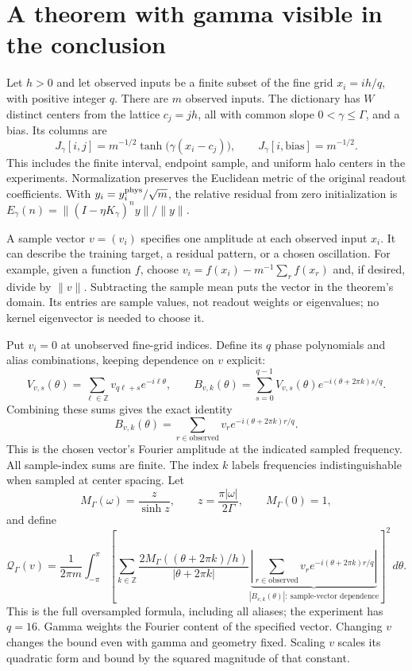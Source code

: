\documentclass[11pt]{article}
\theoremstyle{definition}
\begin{document}
\section{A theorem with gamma visible in the conclusion}
Let $h>0$ and let observed inputs be a finite subset of the fine grid
$x_i=ih/q$, with positive integer $q$. There are $m$ observed inputs.
The dictionary has $W$ distinct centers from the lattice $c_j=jh$, all
with common slope $0<\gamma\le\Gamma$, and a bias. Its columns are
\[
J_\gamma[i,j]=m^{-1/2}\tanh\bigl(\gamma(x_i-c_j)\bigr),\qquad
J_\gamma[i,\mathrm{bias}]=m^{-1/2}.
\]
This includes the finite interval, endpoint sample, and uniform halo centers
in the experiments. Normalization preserves the Euclidean metric of the
original readout coefficients. With $y_i=y_i^{\rm phys}/\sqrt m$, the
relative residual from zero initialization is
$E_\gamma(n)=\|(I-\eta K_\gamma)^ny\|/\|y\|$.

A sample vector $v=(v_i)$ specifies one amplitude at each observed input
$x_i$. It can describe the training target, a residual pattern, or a chosen
oscillation. For example, given a function $f$, choose
$v_i=f(x_i)-m^{-1}\sum_r f(x_r)$ and, if desired, divide by $\|v\|$.
Subtracting the sample mean puts the vector in the theorem's domain.
Its entries are sample values, not readout weights or eigenvalues;
no kernel eigenvector is needed to choose it.

Put $v_i=0$ at unobserved fine-grid indices. Define its $q$ phase
polynomials and alias combinations, keeping dependence on $v$ explicit:
\[
V_{v,s}(\theta)=\sum_{\ell\in\mathbb Z}v_{q\ell+s}e^{-i\ell\theta},\qquad
B_{v,k}(\theta)=\sum_{s=0}^{q-1}V_{v,s}(\theta)e^{-i(\theta+2\pi k)s/q}.
\]
Combining these sums gives the exact identity
\[
B_{v,k}(\theta)=\sum_{r\in\mathrm{observed}}v_r
e^{-i(\theta+2\pi k)r/q}.
\]
This is the chosen vector's Fourier amplitude at the indicated sampled
frequency. All sample-index sums are finite. The index $k$ labels
frequencies indistinguishable when sampled at center spacing. Let
\[
M_\Gamma(\omega)=\frac z{\sinh z},\qquad
z=\frac{\pi|\omega|}{2\Gamma},\qquad M_\Gamma(0)=1,
\]
and define
\[
\mathcal Q_\Gamma(v)=\frac1{2\pi m}\int_{-\pi}^{\pi}
\left[\sum_{k\in\mathbb Z}
\frac{2M_\Gamma((\theta+2\pi k)/h)}{|\theta+2\pi k|}
\underbrace{\left|\sum_{r\in\mathrm{observed}}v_r
e^{-i(\theta+2\pi k)r/q}\right|}_{|B_{v,k}(\theta)|:\ \text{sample-vector dependence}}
\right]^2\,d\theta.
\]
This is the full oversampled formula, including all aliases; the experiment
has $q=16$. Gamma weights the Fourier content of the specified vector.
Changing $v$ changes the bound even with gamma and geometry fixed.
Scaling $v$ scales its quadratic form and bound by the squared magnitude
of that constant.
\end{document}
